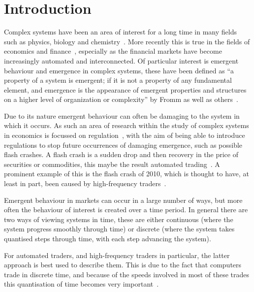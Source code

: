 \documentclass{article}
\begin{document}
\newpage
{}
\tableofcontents
{\textit{ }}
\restoregeometry
\newpage









\section{Introduction}
Complex systems have been an area of interest for a long time in many  fields such as physics, biology and chemistry~\cite{oldcps}. More recently this is true in the fields of economics and finance~\cite{complexecon}, especially as the financial markets have become increasingly automated and interconnected. Of particular interest is emergent behaviour and emergence in complex systems, these have been defined as ``a property of a system is emergent; if it is not a property of any fundamental element, and emergence is the appearance of emergent properties and structures on a higher level of organization or complexity'' by Fromm as well as others~\cite{bubblesandcrashes, emergdef, emegdefs2}.

Due to its nature emergent behaviour can often be damaging to the system in which it occurs. As such an area of research within the study of complex systems in economics is focussed on regulation~\cite{regemergnce}, with the aim of being able to introduce regulations to stop future occurrences of damaging emergence, such as possible flash crashes. A flash crash is a sudden drop and then recovery in the price of securities or commodities, this maybe the result automated trading~\cite{flashauto}. A prominent example of this is the flash crash of 2010, which is thought to have, at least in part, been caused by high-frequency traders~\cite{SECreport_delays, DynamicCoupling_Chris}. 

Emergent behaviour in markets can occur in a large number of ways, but more often the behaviour of interest is created over a time period. In general there are two ways of viewing systems in time, these are either continuous (where the system progress smoothly through time) or discrete (where the system takes quantised steps through time, with each step advancing the system).

For automated traders, and high-frequency traders in particular, the latter approach is best used to describe them. This is due to the fact that computers trade in discrete time, and because of the speeds involved in most of these trades this quantisation of time becomes very important~\cite{discretetiem}. 
\end{document}

